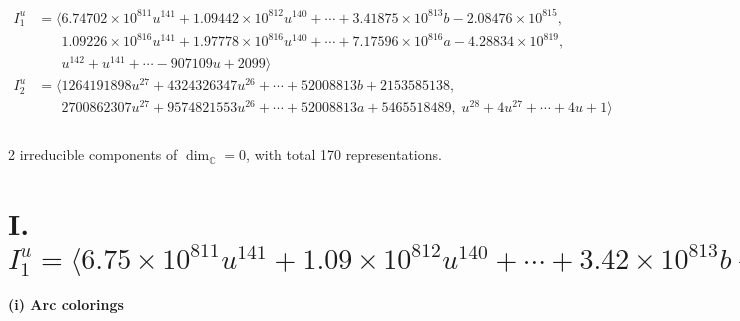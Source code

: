 \documentclass[1p]{elsarticle_modified}
\theoremstyle{definition}
\begin{document}
\begin{align*}
I^u_{1}&=\langle 
6.74702\times10^{811} u^{141}+1.09442\times10^{812} u^{140}+\cdots+3.41875\times10^{813} b-2.08476\times10^{815},\\
\phantom{I^u_{1}}&\phantom{= \langle  }1.09226\times10^{816} u^{141}+1.97778\times10^{816} u^{140}+\cdots+7.17596\times10^{816} a-4.28834\times10^{819},\\
\phantom{I^u_{1}}&\phantom{= \langle  }u^{142}+u^{141}+\cdots-907109 u+2099\rangle \\
I^u_{2}&=\langle 
1264191898 u^{27}+4324326347 u^{26}+\cdots+52008813 b+2153585138,\\
\phantom{I^u_{2}}&\phantom{= \langle  }2700862307 u^{27}+9574821553 u^{26}+\cdots+52008813 a+5465518489,\;u^{28}+4 u^{27}+\cdots+4 u+1\rangle \\
\\
\end{align*}
\raggedright * 2 irreducible components of $\dim_{\mathbb{C}}=0$, with total 170 representations.\\
\newpage
\renewcommand{\arraystretch}{1}
\centering \section*{I. $I^u_{1}= \langle 6.75\times10^{811} u^{141}+1.09\times10^{812} u^{140}+\cdots+3.42\times10^{813} b-2.08\times10^{815},\;1.09\times10^{816} u^{141}+1.98\times10^{816} u^{140}+\cdots+7.18\times10^{816} a-4.29\times10^{819},\;u^{142}+u^{141}+\cdots-907109 u+2099 \rangle$}
\flushleft \textbf{(i) Arc colorings}\\
\end{document}
